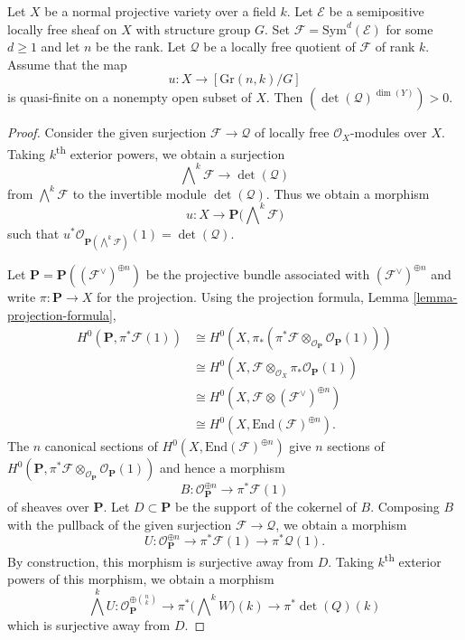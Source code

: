 \begin{lemma}
\label{lemma-positive-self-intersection}
Let $X$ be a normal projective variety over a field $k$.
Let $\mathcal{E}$ be a semipositive locally free sheaf on $X$ with structure
group $G$.
Set $\mathcal{F} = \mathrm{Sym}^d(\mathcal{E})$ for some $d \geq 1$ and let $n$
be the rank.
Let $\mathcal{Q}$ be a locally free quotient of $\mathcal{F}$ of rank $k$.
Assume that the map
$$
u : X \to [\mathrm{Gr}(n,k)/G]
$$
is quasi-finite on a nonempty open subset of $X$.
Then $(\det(\mathcal{Q})^{\dim(Y)}) > 0$.
\end{lemma}

\begin{proof}
Consider the given surjection $\mathcal{F} \to \mathcal{Q}$ of locally free
$\mathcal{O}_X$-modules over $X$.
Taking $k$\textsuperscript{th} exterior powers, we obtain a surjection
$$
  \bigwedge\nolimits^k \mathcal{F} \to \det(\mathcal{Q})
$$
from $\bigwedge^k\mathcal{F}$ to the invertible module $\det(\mathcal{Q})$.
Thus we obtain a morphism
$$
  u : X \to \mathbf{P}\big(\bigwedge\nolimits^k \mathcal{F}\big)
$$
such that
$u^*\mathcal{O}_{\mathbf{P}(\bigwedge^k\mathcal{F})}(1) = \det(\mathcal{Q})$.

Let $\mathbf{P} = \mathbf{P}((\mathcal{F}^\vee)^{\oplus n})$ be the projective
bundle associated with $(\mathcal{F}^\vee)^{\oplus n}$ and write
$\pi : \mathbf{P} \to X$ for the projection.
Using the projection formula, Lemma \ref{lemma-projection-formula},
\begin{align*}
H^0(\mathbf{P}, \pi^*\mathcal{F}(1))
  & \cong
H^0(X, \pi_*(\pi^*\mathcal{F} \otimes_{\mathcal{O}_{\mathbf{P}}}
  \mathcal{O}_{\mathbf{P}}(1))) \\
  & \cong
H^0(X,\mathcal{F} \otimes_{\mathcal{O}_X} \pi_*\mathcal{O}_{\mathbf{P}}(1)) \\
  & \cong
H^0(X,\mathcal{F} \otimes (\mathcal{F}^\vee)^{\oplus n}) \\
  & \cong
H^0(X,\mathrm{End}(\mathcal{F})^{\oplus n}).
\end{align*}
The $n$ canonical sections of $H^0(X,\mathrm{End}(\mathcal{F})^{\oplus n})$
give $n$ sections of
$H^0(\mathbf{P}, \pi^*\mathcal{F}
  \otimes_{\mathcal{O}_{\mathbf{P}}} \mathcal{O}_{\mathbf{P}}(1))$ and hence
a morphism
$$
  B : \mathcal{O}_{\mathbf{P}}^{\oplus n} \to \pi^*\mathcal{F}(1)
$$
of sheaves over $\mathbf{P}$.
Let $D \subset \mathbf{P}$ be the support of the cokernel of $B$.
Composing $B$ with the pullback of the given surjection
$\mathcal{F} \to \mathcal{Q}$, we obtain a morphism
$$
  U : \mathcal{O}_{\mathbf{P}}^{\oplus n} \to
        \pi^*\mathcal{F}(1) \to
        \pi^*\mathcal{Q}(1).
$$
By construction, this morphism is surjective away from $D$.
Taking $k$\textsuperscript{th} exterior powers of this morphism, we obtain a
morphism
$$
  \bigwedge^k U : \mathcal{O}_{\mathbf{P}}^{\oplus \binom{n}{k}} \to
    \pi^*\big(\bigwedge\nolimits^k W\big)(k) \to
    \pi^*\det(Q)(k)
$$
which is surjective away from $D$.


\end{proof}
